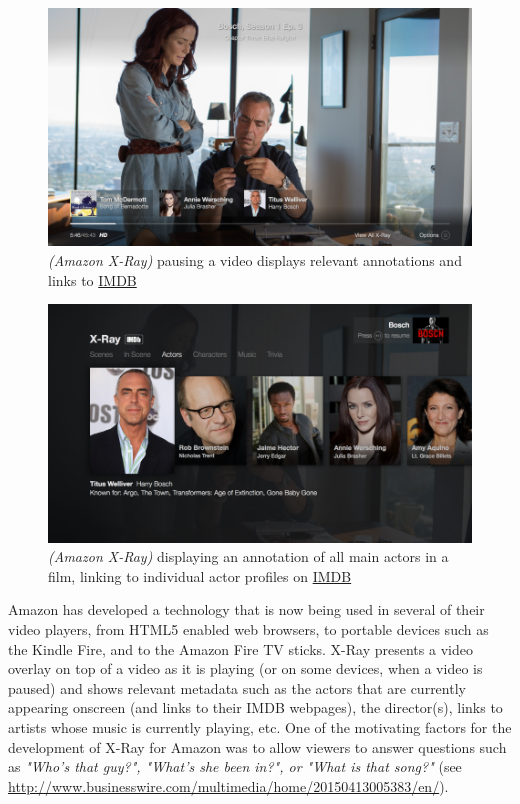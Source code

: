 \begin{figure}[ht]
	\includegraphics[width=\textwidth]{gfx/amazon-x-ray/pause-quick-view-930x523.png}
	\caption{\textit{(Amazon X-Ray)} pausing a video displays relevant annotations and links to \href{http://www.imdb.com}{IMDB}} 
	\label{fig:amazon-x-ray:paused-video-annotations}
\end{figure} 

\begin{figure}[ht]
	\includegraphics[width=\textwidth]{gfx/amazon-x-ray/xray-actors-930x523.png}
	\caption{\textit{(Amazon X-Ray)} displaying an annotation of all main actors in a film, linking to individual actor profiles on \href{http://www.imdb.com}{IMDB}} 
	\label{fig:amazon-x-ray:actors-listing}
\end{figure}

Amazon has developed a technology that is now being used in several of their video players, from HTML5 enabled web browsers, to portable devices such as the Kindle Fire, and to the Amazon Fire TV sticks. X-Ray presents a video overlay on top of a video as it is playing (or on some devices, when a video is paused) and shows relevant metadata such as the actors that are currently appearing onscreen (and links to their IMDB webpages), the director(s), links to artists whose music is currently playing, etc.  One of the motivating factors for the development of X-Ray for Amazon was to allow viewers to answer questions such as \textit{"Who's that guy?", "What's she been in?", or "What is that song?"} (see \url{http://www.businesswire.com/multimedia/home/20150413005383/en/}). 

